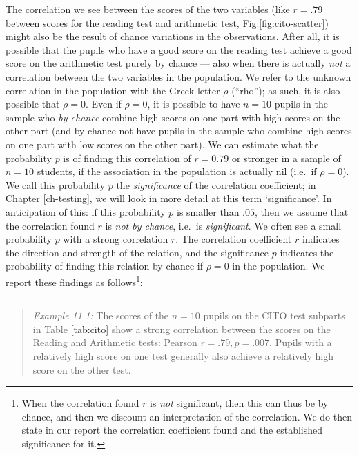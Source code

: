 \documentclass[
]{book}
\begin{document}
The correlation we see between the scores of the two variables (like
\(r=.79\) between scores for the reading test and arithmetic test,
Fig.\ref{fig:cito-scatter}) might also be the result of
chance variations in the observations. After all, it is possible that
the pupils who have a good score on the reading test achieve
a good score on the arithmetic test purely by chance --- also when there is
actually \emph{not} a correlation between the two variables in the population. We
refer to the unknown correlation in the population with the Greek letter
\(\rho\) (``rho''); as such, it is also possible that \(\rho=0\). Even if \(\rho=0\),
it is possible to have \(n=10\) pupils in the sample who \emph{by chance} combine
high scores on one part with high scores on the other part (and by chance not
have pupils in the sample who combine high scores on one part with low scores
on the other part). We can estimate what the probability \(p\) is
of finding this correlation of \(r=0.79\) or stronger in a sample of
\(n=10\) students, if the association in the population is actually
nil (i.e.~if \(\rho=0\)). We call this probability \(p\) the
\emph{significance} of the correlation coefficient; in Chapter \ref{ch-testing},
we will look in more detail at this term `significance'.
In anticipation of this: if this probability \(p\) is smaller than
\(.05\), then we assume that the correlation found \(r\) is \emph{not by chance},
i.e.~is \emph{significant}. We often see a small probability \(p\) with a strong
correlation \(r\). The correlation coefficient \(r\) indicates the direction
and strength of the relation, and the significance \(p\) indicates the probability
of finding this relation by chance if \(\rho=0\) in the population. We report
these findings as follows\footnote{When the correlation found \(r\) is \emph{not} significant, then this can thus be by chance,
  and then we discount an interpretation of the correlation. We do then state in our report
  the correlation coefficient found and the established significance for it.}:

\begin{center}\rule{0.5\linewidth}{0.5pt}\end{center}

\begin{quote}
\emph{Example 11.1:}
The scores of the \(n=10\) pupils on the CITO test subparts in
Table \ref{tab:cito} show a strong correlation between the scores
on the Reading and Arithmetic tests: Pearson \(r=.79, p=.007\). Pupils
with a relatively high score on one test generally also achieve
a relatively high score on the other test.
\end{quote}
\end{document}

